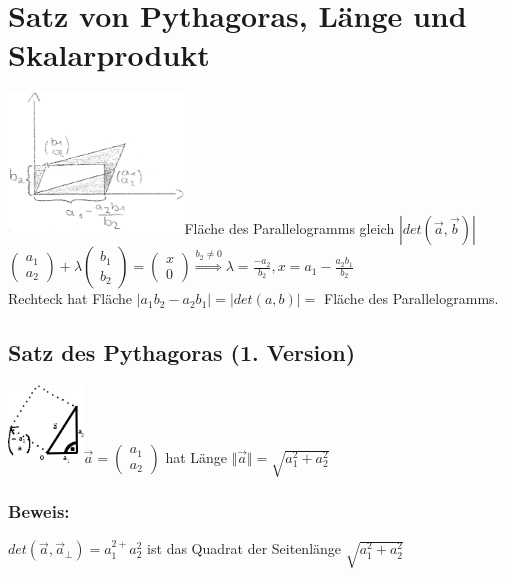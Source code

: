 \section{Satz von Pythagoras, Länge und Skalarprodukt}
		\includegraphics[width=0.35\textwidth]
	{mainmatter/chapter1/pics/parallelogram.png}Fläche des Parallelogramms gleich $|det(\vec{a},\vec{b})|$\\
$\begin{pmatrix} a_{1} \\ a_{2} \end{pmatrix} + \lambda \begin{pmatrix} b_{1} \\ b_{2} \end{pmatrix} = \begin{pmatrix} x \\ 0 \end{pmatrix} \mathop{\Rightarrow}\limits^{b_{2} \neq 0} \lambda = \frac{-a_{2}}{b_{2}}, x=a_{1}-\frac{a_{2}b_{1}}{b_{2}}$ \\
Rechteck hat Fläche $\vert a_{1}b_{2}-a_{2}b_{1}\vert=\vert det(a,b) \vert =$ Fläche des Parallelogramms. 
%
%
%
\subsection{Satz des Pythagoras (1. Version)}
\includegraphics[width=0.15\textwidth]
	{mainmatter/chapter1/pics/pyth.png}$\vec{a} = \begin{pmatrix} a_{1} \\ a_{2} \end{pmatrix}$ hat Länge $\Vert \vec{a} \Vert = \sqrt{a_{1}^{2} + a_{2}^{2}}$
%
%
%
\subsubsection{Beweis:}
$det(\vec{a},\vec{a}_{\perp})=a_{1}^{2+}a_{2}^{2}$ ist das Quadrat der Seitenlänge $\sqrt{a_{1}^{2}+a_{2}^{2}}$
%
%
%
